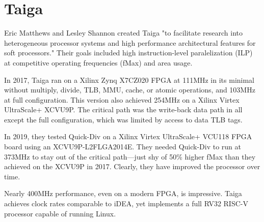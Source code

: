 \chapter{Taiga}

Eric Matthews and Lesley Shannon created Taiga "to facilitate research into heterogeneous processor systems and high performance architectural features for soft processors."  Their goals included high instruction-level paralelization (ILP) at competitive operating frequencies (fMax) and area usage.

In 2017, Taiga ran on a Xilinx Zynq X7CZ020 FPGA at 111MHz in its minimal without multiply, divide, TLB, MMU, cache, or atomic operations, and 103MHz at full configuration.  This version also achieved 254MHz on a Xilinx Virtex UltraScale+ XCVU9P.  The critical path was the write-back data path in all except the full configuration, which was limited by access to data TLB tags.

In 2019, they tested Quick-Div on a Xilinx Virtex UltraScale+ VCU118 FPGA board using an XCVU9P-L2FLGA2014E.  They needed Quick-Div to run at 373MHz to stay out of the critical path—just shy of 50\% higher fMax than they achieved on the XCVU9P in 2017.  Clearly, they have improved the processor over time.

Nearly 400MHz performance, even on a modern FPGA, is impressive.  Taiga achieves clock rates comparable to iDEA, yet implements a full RV32 RISC-V processor capable of running Linux.

